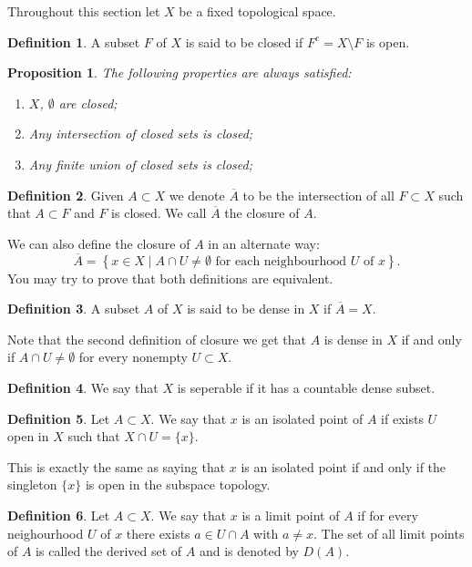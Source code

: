 \documentclass[11pt,a4paper]{article}
\theoremstyle{definition}
\newtheorem{definition}{Definition}[section]
\theoremstyle{plain}
\newtheorem{proposition}[theorem]{Proposition}
\newcommand{\set}[2]{ \left\{ #1 \mid #2 \right\} }
\begin{document}
	Throughout this section let $X$ be a fixed topological space.
	\begin{definition}
		A subset $F$ of $X$ is said to be closed if $F^c = X \setminus F$ is open.
	\end{definition}
	\begin{proposition}
		The following properties are always satisfied:
		\begin{enumerate}
			\item $X$, $\emptyset$ are closed;
			\item Any intersection of closed sets is closed;
			\item Any finite union of closed sets is closed;
		\end{enumerate}
	\end{proposition}
	\begin{definition}
		Given $A \subset X$ we denote $\overline{A}$ to be the intersection of
		all $F \subset X$ such that $A \subset F$ and $F$ is closed. We call
		$\overline{A}$ the closure of $A$.
	\end{definition}
	We can also define the closure of $A$ in an alternate way:
	\[
		\overline{A} = \set{x \in X}{A \cap U \neq \emptyset \,\,\text{for each 
		neighbourhood $U$ of $x$}}.
	\]
	You may try to prove that both definitions are equivalent.
	\begin{definition}
		A subset $A$ of $X$ is said to be dense in $X$ if $\overline{A} = X$.
	\end{definition}
	Note that the second definition of closure we get that $A$ is dense in $X$
	if and only if $A \cap U \neq \emptyset$ for every nonempty $U \subset X$.
	\begin{definition}
		We say that $X$ is seperable if it has a countable dense subset.
	\end{definition}
	\begin{definition}
		Let $A \subset X$. We say that $x$ is an isolated point of $A$ if exists
		$U$ open in $X$ such that $X \cap U = \{x\}$.
	\end{definition}
	This is exactly the same as saying that $x$ is an isolated point if and
	only if the singleton $\{x\}$ is open in the subspace topology.
	\begin{definition}
		Let $A \subset X$. We say that $x$ is a limit point of $A$ if for every
		neighourhood $U$ of $x$ there exists $a \in U \cap A$ with $a \neq x$.
		The set of all limit points of $A$ is called the derived set of $A$
		and is denoted by $D(A)$.
	\end{definition}
\end{document}
